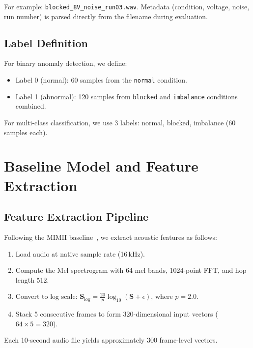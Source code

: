 \documentclass[12pt, a4paper]{article}
\begin{document}
For example: \texttt{blocked\_8V\_noise\_run03.wav}. Metadata (condition, voltage, noise, run number) is parsed directly from the filename during evaluation.

\subsection{Label Definition}

For binary anomaly detection, we define:
\begin{itemize}
    \item Label 0 (normal): 60 samples from the \texttt{normal} condition.
    \item Label 1 (abnormal): 120 samples from \texttt{blocked} and \texttt{imbalance} conditions combined.
\end{itemize}

For multi-class classification, we use 3 labels: normal, blocked, imbalance (60 samples each).


\section{Baseline Model and Feature Extraction}
\label{sec:baseline}

\subsection{Feature Extraction Pipeline}

Following the MIMII baseline~\cite{purohit2019mimii}, we extract acoustic features as follows:

\begin{enumerate}
    \item Load audio at native sample rate (16\,kHz).
    \item Compute the Mel spectrogram with 64 mel bands, 1024-point FFT, and hop length 512.
    \item Convert to log scale: $\mathbf{S}_{\text{log}} = \frac{20}{p} \log_{10}(\mathbf{S} + \epsilon)$, where $p = 2.0$.
    \item Stack 5 consecutive frames to form 320-dimensional input vectors ($64 \times 5 = 320$).
\end{enumerate}

Each 10-second audio file yields approximately 300 frame-level vectors.
\end{document}
